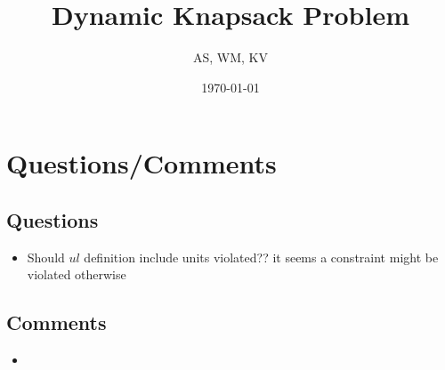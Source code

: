 \documentclass{article}
\title{Dynamic Knapsack Problem}
\author{AS, WM, KV}
\date{\today}
\begin{document}
\maketitle
\tableofcontents
\newpage


\section{Questions/Comments}

\subsection{Questions}
\begin{itemize}
	\item Should $ul$ definition include units violated?? it seems a constraint might be violated otherwise
\end{itemize}

\subsection{Comments}
\begin{itemize}
	\item
\end{itemize}
\end{document}
